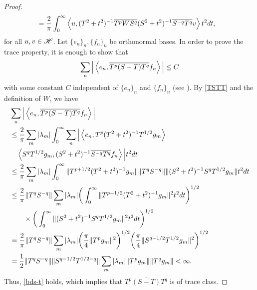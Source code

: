 \documentclass[12pt]{article}
\theoremstyle{plain}
\numberwithin{equation}{section}
\theoremstyle{remark}
\begin{document}
\begin{proof}
\begin{align}
& = \frac{2}{\pi} \int_0^\infty \left\langle u,(T^2+t^2)^{-1} \overline{T^{p} W S^{q}} (S^2+t^2)^{-1} \overline{S^{-q}T^q}v\right\rangle t^2dt,\label{TSTT}
\end{align}
for all $u,v\in\mathscr{H}$.
Let $\{e_n\}_n, \{f_n\}_n$ be orthonormal bases. In order to prove 
the trace property, it is enough to show that 
\begin{align}
  \sum_{n} \Big| \left\langle e_n,\overline{T^p(S-T)T^q}f_n\right\rangle \Big| \leq C \label{bds-t}
\end{align}
with some constant $C$ independent of $\{e_n\}_n$ and $\{f_n\}_n$ (see \cite[Proposition 3.6.5]{Si15}).
By \eqref{TSTT} and the definition of $W$, we have
\begin{align*}
& \sum_{n} \Big| \left\langle e_n,\overline{T^p(S-T)T^q}f_n\right\rangle \Big| \\
&\leq \frac{2}{\pi} \sum_{m} | \lambda_m | \int_0^\infty  \sum_{n} \Big| \left\langle e_n,T^p(T^2+t^2)^{-1}T^{1/2}g_m\right\rangle \\ 
& \quad \left\langle S^qT^{1/2}g_m,(S^2+t^2)^{-1}\overline{S^{-q}T^q}f_n\right\rangle \Big| t^2 dt \\
&\leq \frac{2}{\pi} \sum_{m} | \lambda_m | \int_0^\infty \| T^{p+1/2}(T^2+t^2)^{-1} g_m \| \| T^qS^{-q} \| \| (S^2+t^2)^{-1}S^qT^{1/2}g_m \| t^2 dt \\
&\leq \frac{2}{\pi} \| T^qS^{-q} \| \sum_{m} | \lambda_m | \bigg( \int_0^\infty  \| T^{p+1/2}(T^2+t^2)^{-1} g_m \|^2 t^2dt \bigg)^{1/2} \\
&\qquad \times      \bigg( \int_0^\infty \| (S^2+t^2)^{-1}S^q T^{1/2}g_m \|^2 t^2 dt  \bigg)^{1/2} \\
&= \frac{2}{\pi} \| T^qS^{-q} \| \sum_{m} | \lambda_m | \bigg( \frac{\pi}{4}\| T^pg_m \|^2  \bigg)^{1/2} \bigg( \frac{\pi}{4} \| S^{q-1/2}T^{1/2}g_m \|^2 \bigg)^{1/2} \\
&= \frac{1}{2} \| T^qS^{-q} \| \| S^{q-1/2}T^{1/2-q} \| \sum_{m} | \lambda_m | \| T^pg_m \| \| T^qg_m \|  < \infty.
\end{align*}
Thus, \eqref{bds-t} holds, which implies that $\overline{T^p(S-T)T^q}$ is of trace class.
\end{proof}
\end{document}
